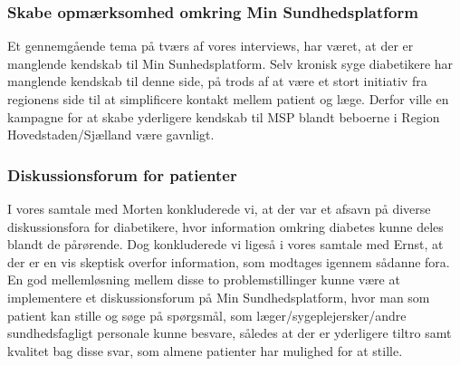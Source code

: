 \subsubsection{Skabe opmærksomhed omkring Min Sundhedsplatform}
Et gennemgående tema på tværs af vores interviews, har været, at der er manglende kendskab til Min Sunhedsplatform. Selv kronisk syge diabetikere har manglende kendskab til denne side, på trods af at være et stort initiativ fra regionens side til at simplificere kontakt mellem patient og læge. Derfor ville en kampagne for at skabe yderligere kendskab til MSP blandt beboerne i Region Hovedstaden/Sjælland være gavnligt.

\subsubsection{Diskussionsforum for patienter}
I vores samtale med Morten konkluderede vi, at der var et afsavn på diverse diskussionsfora for diabetikere, hvor information omkring diabetes kunne deles blandt de pårørende.
Dog konkluderede vi ligeså i vores samtale med Ernst, at der er en vis skeptisk overfor information, som modtages igennem sådanne fora. En god mellemløsning mellem disse to problemstillinger kunne være at implementere et diskussionsforum på Min Sundhedsplatform, hvor man som patient kan stille og søge på spørgsmål, som læger/sygeplejersker/andre sundhedsfagligt personale kunne besvare, således at der er yderligere tiltro samt kvalitet bag disse svar, som almene patienter har mulighed for at stille. 
